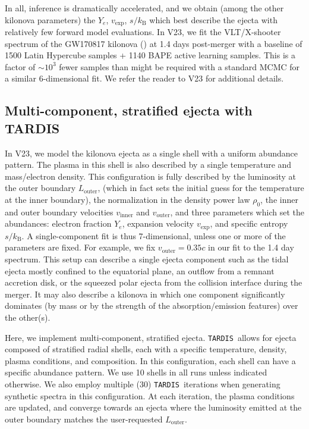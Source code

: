 \documentclass[twocolumn,twocolappendix]{aastex63}
\def\TARDIS{\texttt{TARDIS}}
\begin{document}
In all, inference is dramatically accelerated, and we obtain (among the other kilonova parameters) the $Y_e$, $v_{\mathrm{exp}}$, $s / k_{\mathrm{B}}$ which best describe the ejecta with relatively few forward model evaluations. In V23, we fit the VLT/X-shooter spectrum of the GW170817 kilonova (\citealt{pian17, smartt17}) at 1.4 days post-merger with a baseline of 1500 Latin Hypercube samples + 1140 BAPE active learning samples. This is a factor of $\sim 10^3$ fewer samples than might be required with a standard MCMC for a similar 6-dimensional fit. We refer the reader to V23 for additional details.




\subsection{Multi-component, stratified ejecta with \textsc{TARDIS}}\label{ssc:multi-component-TARDIS}

In V23, we model the kilonova ejecta as a single shell with a uniform abundance pattern. The plasma in this shell is also described by a single temperature and mass/electron density. This configuration is fully described by the luminosity at the outer boundary $L_{\mathrm{outer}}$, (which in fact sets the initial guess for the temperature at the inner boundary), the normalization in the density power law $\rho_0$, the inner and outer boundary velocities $v_{\mathrm{inner}}$ and $v_{\mathrm{outer}}$, and three parameters which set the abundances: electron fraction $Y_e$, expansion velocity $v_{\mathrm{exp}}$, and specific entropy $s / k_{\mathrm{B}}$. A single-component fit is thus 7-dimensional, unless one or more of the parameters are fixed. For example, we fix $v_{\mathrm{outer}} = 0.35c$ in our fit to the 1.4 day spectrum. This setup can describe a single ejecta component such as the tidal ejecta mostly confined to the equatorial plane, an outflow from a remnant accretion disk, or the squeezed polar ejecta from the collision interface during the merger. It may also describe a kilonova in which one component significantly dominates (by mass or by the strength of the absorption/emission features) over the other(s). 
    
Here, we implement multi-component, stratified ejecta. \TARDIS~allows for ejecta composed of stratified radial shells, each with a specific temperature, density, plasma conditions, and composition. In this configuration, each shell can have a specific abundance pattern. We use 10 shells in all runs unless indicated otherwise. We also employ multiple (30) \TARDIS~iterations when generating synthetic spectra in this configuration. At each iteration, the plasma conditions are updated, and converge towards an ejecta where the luminosity emitted at the outer boundary matches the user-requested $L_{\mathrm{outer}}$. 
    
\end{document}

